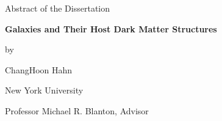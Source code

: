\documentclass[12pt,letterpaper]{article}
\newcommand{\thesistitle}{Galaxies and Their Host Dark Matter Structures}
\newcommand{\thesisauthor}{ChangHoon Hahn}
\newcommand{\thesisadvisor}{Professor Michael R. Blanton}
\begin{document}
  \begin{center}
    Abstract of the Dissertation\bigskip

    \textbf{\thesistitle}\bigskip

    by\bigskip

    \thesisauthor\bigskip

    New York University\bigskip

    \thesisadvisor, Advisor
  \end{center}
\bigskip


\end{document}
